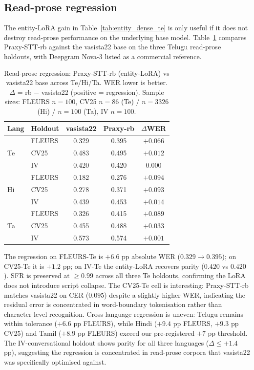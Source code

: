 \documentclass[conference,a4paper]{IEEEtran}
\begin{document}
\subsection{Read-prose regression}\label{sec:regression}

The entity-LoRA gain in Table~\ref{tab:entity_dense_te} is only useful if it does not destroy read-prose performance on the underlying base model. Table~\ref{tab:read_prose_te} compares Praxy-STT-rb against the vasista22 base on the three Telugu read-prose holdouts, with Deepgram Nova-3 listed as a commercial reference.

\begin{table}[t]
\centering
\caption{Read-prose regression: Praxy-STT-rb (entity-LoRA) vs vasista22 base across Te/Hi/Ta. WER lower is better. $\Delta$ = rb $-$ vasista22 (positive = regression). Sample sizes: FLEURS $n=100$, CV25 $n=86$ (Te) / $n=3326$ (Hi) / $n=100$ (Ta), IV $n=100$.}
\label{tab:read_prose_te}
\begin{tabular}{llccc}
\toprule
Lang & Holdout & vasista22 & Praxy-rb & $\Delta$WER \\
\midrule
\multirow{3}{*}{Te}
  & FLEURS  & 0.329 & 0.395 & $+0.066$ \\
  & CV25    & 0.483 & 0.495 & $+0.012$ \\
  & IV      & 0.420 & 0.420 & $0.000$  \\
\midrule
\multirow{3}{*}{Hi}
  & FLEURS  & 0.182 & 0.276 & $+0.094$ \\
  & CV25    & 0.278 & 0.371 & $+0.093$ \\
  & IV      & 0.439 & 0.453 & $+0.014$ \\
\midrule
\multirow{3}{*}{Ta}
  & FLEURS  & 0.326 & 0.415 & $+0.089$ \\
  & CV25    & 0.455 & 0.488 & $+0.033$ \\
  & IV      & 0.573 & 0.574 & $+0.001$ \\
\bottomrule
\end{tabular}
\end{table}

The regression on FLEURS-Te is $+6.6$ pp absolute WER ($0.329 \rightarrow 0.395$); on CV25-Te it is $+1.2$ pp; on IV-Te the entity-LoRA recovers parity ($0.420$ vs $0.420$). SFR is preserved at $\geq 0.99$ across all three Te holdouts, confirming the LoRA does not introduce script collapse. The CV25-Te cell is interesting: Praxy-STT-rb matches vasista22 on CER ($0.095$) despite a slightly higher WER, indicating the residual error is concentrated in word-boundary tokenisation rather than character-level recognition. Cross-language regression is uneven: Telugu remains within tolerance ($+6.6$ pp FLEURS), while Hindi ($+9.4$ pp FLEURS, $+9.3$ pp CV25) and Tamil ($+8.9$ pp FLEURS) exceed our pre-registered $+7$ pp threshold. The IV-conversational holdout shows parity for all three languages ($\Delta \leq +1.4$ pp), suggesting the regression is concentrated in read-prose corpora that vasista22 was specifically optimised against.
\end{document}
